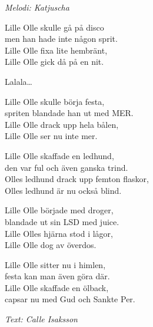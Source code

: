 {\footnotesize\textit{Melodi: Katjuscha}}\par
\vspace{10pt}
Lille Olle skulle gå på disco\\
men han hade inte någon sprit.\\
Lille Olle fixa lite hembränt,\\
Lille Olle gick då på en nit.\par
\vspace{10pt}
Lalala…\par
\vspace{10pt}
Lille Olle skulle börja festa,\\
spriten blandade han ut med MER.\\
Lille Olle drack upp hela bålen,\\
Lille Olle ser nu inte mer.\par
\vspace{10pt}
Lille Olle skaffade en ledhund,\\
den var ful och även ganska trind.\\
Olles ledhund drack upp femton flaskor,\\
Olles ledhund är nu också blind.\par
\vspace{10pt}
Lille Olle började med droger,\\
blandade ut sin LSD med juice.\\
Lille Olles hjärna stod i lågor,\\
Lille Olle dog av överdos.\par
\vspace{10pt}
Lille Olle sitter nu i himlen,\\
festa kan man även göra där.\\
Lille Olle skaffade en ölback,\\
capsar nu med Gud och Sankte Per.
\par
\vspace{10pt}
{\footnotesize\textit{Text: Calle Isaksson}}
